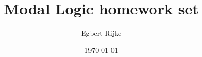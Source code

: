 \title{Modal Logic homework set \hwnumber}
\author{Egbert Rijke}
\date\today

\usepackage{mathpazo}
\usepackage{amsmath,amsthm,amssymb,stmaryrd}
\usepackage{tikz-cd}
\usepackage{xcolor}

\renewcommand{\theenumi}{\alph{enumi}}
\renewcommand{\labelenumi}{(\theenumi)}

\newcommand{\note}[1]{{\color{red}#1}}

\newcommand{\lsem}{\llbracket}
\newcommand{\rsem}{\rrbracket}
\newcommand{\nec}{\square}
\newcommand{\pos}{\lozenge}
\renewcommand{\models}{\vDash}
\newcommand{\nmodels}{\nvDash}

\theoremstyle{definition}
\newtheorem{ex}{Exercise}

